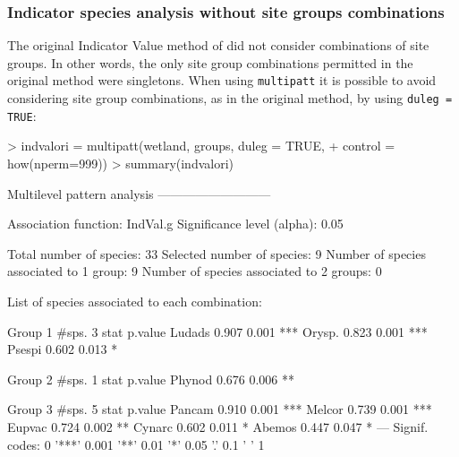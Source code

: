 \documentclass[11pt,a4paper]{article}
\begin{document}
\subsubsection{Indicator species analysis without site groups combinations}
The original Indicator Value method of \citet{Dufrene1997} did not consider combinations of site groups. In other words, the only site group combinations permitted in the original method were singletons. When using \texttt{multipatt} it is possible to avoid considering site group combinations, as in the original method, by using \texttt{duleg = TRUE}:
\begin{Schunk}
\begin{Sinput}
> indvalori = multipatt(wetland, groups, duleg = TRUE, 
+                       control = how(nperm=999)) 
> summary(indvalori)
\end{Sinput}
\begin{Soutput}
 Multilevel pattern analysis
 ---------------------------

 Association function: IndVal.g
 Significance level (alpha): 0.05

 Total number of species: 33
 Selected number of species: 9 
 Number of species associated to 1 group: 9 
 Number of species associated to 2 groups: 0 

 List of species associated to each combination: 

 Group 1  #sps.  3 
        stat p.value    
Ludads 0.907   0.001 ***
Orysp. 0.823   0.001 ***
Psespi 0.602   0.013 *  

 Group 2  #sps.  1 
        stat p.value   
Phynod 0.676   0.006 **

 Group 3  #sps.  5 
        stat p.value    
Pancam 0.910   0.001 ***
Melcor 0.739   0.001 ***
Eupvac 0.724   0.002 ** 
Cynarc 0.602   0.011 *  
Abemos 0.447   0.047 *  
---
Signif. codes:  0 '***' 0.001 '**' 0.01 '*' 0.05 '.' 0.1 ' ' 1 
\end{Soutput}
\end{Schunk}
\end{document}
